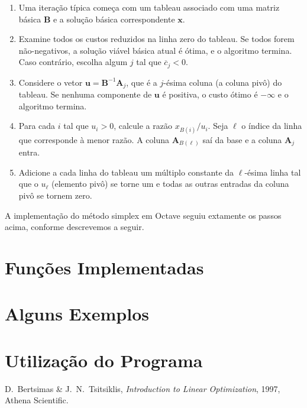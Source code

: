 \documentclass[12pt,a4paper]{article}
\newcommand{\vet}{\mathbf}                                   %
\newcommand{\zerar}{\setcounter{equation}{0}\setcounter{figure}{0}\setcounter{table}{0}}
\begin{document}
\vspace{-0.2cm}
\begin{enumerate}
	\item Uma iteração típica começa com um tableau associado com uma matriz básica $\vet{B}$ e a 
	solução básica correspondente $\vet{x}$.
	\item Examine todos os custos reduzidos na linha zero do tableau. Se todos forem não-negativos,
	a solução viável básica atual é ótima, e o algoritmo termina. Caso contrário, escolha algum $j$
	tal que $\overline{c}_j < 0$.
	\item Considere o vetor $\vet{u} = \vet{B}^{-1}\vet{A}_j$, que é a $j$-ésima coluna (a coluna 
	pivô) do tableau. Se nenhuma componente de $\vet{u}$ é positiva, o custo ótimo é $-\infty$ e o 
	algoritmo termina.
	\item Para cada $i$ tal que $u_i > 0$, calcule a razão $x_{B(i)}/u_i$. Seja $\ell$ o índice da 
	linha que corresponde à menor razão. A coluna $\vet{A}_{B(\ell)}$ saí da base e a coluna 
	$\vet{A}_j$ entra.
	\item Adicione a cada linha do tableau um múltiplo constante da $\ell$-ésima linha tal que o 
	$u_\ell$ (elemento pivô) se torne um e todas as outras entradas da coluna pivô se tornem zero. 
\end{enumerate}

A implementação do método simplex em Octave seguiu extamente os passos acima, conforme descrevemos
a seguir.


\zerar
\section{Funções Implementadas}
\label{sec:funcoes}


\zerar
\section{Alguns Exemplos}
\label{sec:exemplos}


\zerar
\section{Utilização do Programa}
\label{sec:programa}


\begin{thebibliography}{99}
	 D.~Bertsimas \& J.~N.~Tsitsiklis, {\it Introduction to Linear Optimization}, 
	1997, Athena Scientific.
\end{thebibliography}

\end{document}
